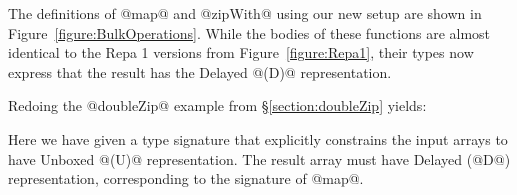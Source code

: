 The definitions of @map@ and @zipWith@ using our new setup are shown in Figure~\ref{figure:BulkOperations}. While the bodies of these functions are almost identical to the Repa 1 versions from Figure~\ref{figure:Repa1}, their types now express that the result has the Delayed @(D)@ representation. 

Redoing the @doubleZip@ example from \S\ref{section:doubleZip} yields:
%
\begin{small}
\end{small}
%
Here we have given a type signature that explicitly constrains the input arrays to have Unboxed @(U)@ representation. The result array must have Delayed (@D@) representation, corresponding to the signature of @map@. 

